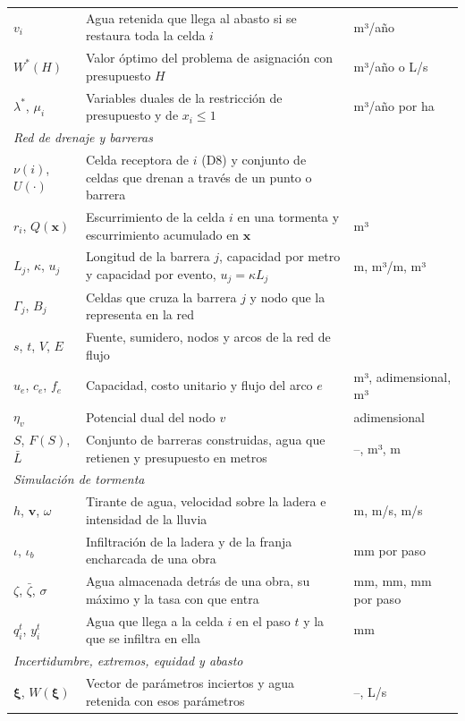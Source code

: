 \documentclass[11pt,letterpaper]{article}
\begin{document}
\begin{table}[H]
\begin{tabularx}{\linewidth}{lXl}
$v_i$ & Agua retenida que llega al abasto si se restaura toda la celda $i$ & m³/año \\
$W^\ast(H)$ & Valor óptimo del problema de asignación con presupuesto $H$ & m³/año o L/s \\
$\lambda^\ast$, $\mu_i$ & Variables duales de la restricción de presupuesto y de $x_i\le1$ & m³/año por ha \\
\multicolumn{3}{l}{\textit{Red de drenaje y barreras}}\\
$\nu(i)$, $U(\cdot)$ & Celda receptora de $i$ (D8) y conjunto de celdas que drenan a través de un punto o barrera & \\
$r_i$, $Q(\mathbf x)$ & Escurrimiento de la celda $i$ en una tormenta y escurrimiento acumulado en $\mathbf x$ & m³ \\
$L_j$, $\kappa$, $u_j$ & Longitud de la barrera $j$, capacidad por metro y capacidad por evento, $u_j=\kappa L_j$ & m, m³/m, m³ \\
$\Gamma_j$, $B_j$ & Celdas que cruza la barrera $j$ y nodo que la representa en la red & \\
$s$, $t$, $V$, $E$ & Fuente, sumidero, nodos y arcos de la red de flujo & \\
$u_e$, $c_e$, $f_e$ & Capacidad, costo unitario y flujo del arco $e$ & m³, adimensional, m³ \\
$\eta_v$ & Potencial dual del nodo $v$ & adimensional \\
$S$, $F(S)$, $\bar L$ & Conjunto de barreras construidas, agua que retienen y presupuesto en metros & --, m³, m \\
\multicolumn{3}{l}{\textit{Simulación de tormenta}}\\
$h$, $\mathbf v$, $\omega$ & Tirante de agua, velocidad sobre la ladera e intensidad de la lluvia & m, m/s, m/s \\
$\iota$, $\iota_b$ & Infiltración de la ladera y de la franja encharcada de una obra & mm por paso \\
$\zeta$, $\bar\zeta$, $\sigma$ & Agua almacenada detrás de una obra, su máximo y la tasa con que entra & mm, mm, mm por paso \\
$q_i^t$, $y_i^t$ & Agua que llega a la celda $i$ en el paso $t$ y la que se infiltra en ella & mm \\
\multicolumn{3}{l}{\textit{Incertidumbre, extremos, equidad y abasto}}\\
$\boldsymbol\xi$, $W(\boldsymbol\xi)$ & Vector de parámetros inciertos y agua retenida con esos parámetros & --, L/s \\

\end{tabularx}
\end{table}
\end{document}
